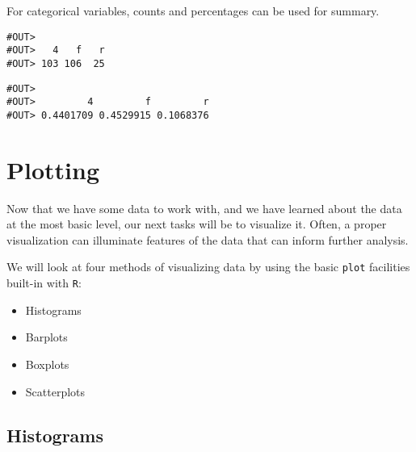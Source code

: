 \documentclass[]{book}
\newenvironment{Shaded}{\begin{snugshade}}{\end{snugshade}}
\newcommand{\KeywordTok}[1]{\textcolor[rgb]{0.13,0.29,0.53}{\textbf{#1}}}
\newcommand{\StringTok}[1]{\textcolor[rgb]{0.31,0.60,0.02}{#1}}
\newcommand{\OperatorTok}[1]{\textcolor[rgb]{0.81,0.36,0.00}{\textbf{#1}}}
\newcommand{\NormalTok}[1]{#1}
\providecommand{\tightlist}{%
  \setlength{\itemsep}{0pt}\setlength{\parskip}{0pt}}
\begin{document}
For categorical variables, counts and percentages can be used for
summary.

\begin{Shaded}
\end{Shaded}

\begin{verbatim}
#OUT> 
#OUT>   4   f   r 
#OUT> 103 106  25
\end{verbatim}

\begin{Shaded}
\end{Shaded}

\begin{verbatim}
#OUT> 
#OUT>         4         f         r 
#OUT> 0.4401709 0.4529915 0.1068376
\end{verbatim}

\section{Plotting}\label{plotting}

Now that we have some data to work with, and we have learned about the
data at the most basic level, our next tasks will be to visualize it.
Often, a proper visualization can illuminate features of the data that
can inform further analysis.

We will look at four methods of visualizing data by using the basic
\texttt{plot} facilities built-in with \texttt{R}:

\begin{itemize}
\tightlist
\item
  Histograms
\item
  Barplots
\item
  Boxplots
\item
  Scatterplots
\end{itemize}

\subsection{Histograms}\label{histograms}
\end{document}
